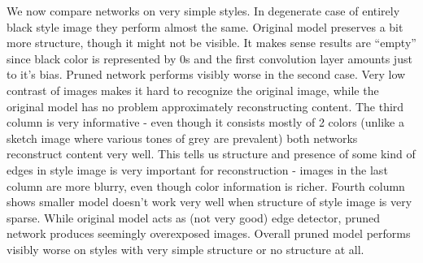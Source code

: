 \documentclass[../Main.tex]{subfiles}
\begin{document}
We now compare networks on very simple styles. In degenerate case of entirely black
style image they perform almost the same. Original model preserves a bit more 
structure, though it might not be visible. It makes sense results are ``empty''
since black color is represented by $0$s and the first convolution layer amounts
just to it's bias. Pruned network performs visibly worse in the second case.
Very low contrast of images makes it hard to recognize the original image, while
the original model has no problem approximately reconstructing content. 
The third column is very informative - even though it consists mostly of 2 colors
(unlike a sketch image where various tones of grey are prevalent) both networks
reconstruct content very well. This tells us structure and presence of some kind
of edges in style image is very important for reconstruction - images in the last
column are more blurry, even though color information is richer.
Fourth column shows smaller model  doesn't work very well when structure of style 
image is very sparse. While original model acts as (not very good) edge detector,
pruned network produces seemingly overexposed images.
Overall pruned model performs visibly worse on styles with very simple structure or no
structure at all. 

\newpage
\end{document}
